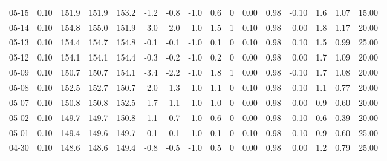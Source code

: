 \begin{threeparttable}
{\begin{tabular}{lrrrrrrrrrrrrrrr}
  05-15 &     0.10 & 151.9 & 151.9 & 153.2 &       -1.2 &           -0.8 &                     -1.0 &                 0.6 &              0 &       0.00 &      0.98 &          -0.10 &              1.6 &            1.07 &                  15.00 \\
  05-14 &     0.10 & 154.8 & 155.0 & 151.9 &        3.0 &            2.0 &                      1.0 &                 1.5 &              1 &       0.10 &      0.98 &           0.00 &              1.8 &            1.17 &                  20.00 \\
  05-13 &     0.10 & 154.4 & 154.7 & 154.8 &       -0.1 &           -0.1 &                     -1.0 &                 0.1 &              0 &       0.10 &      0.98 &           0.10 &              1.5 &            0.99 &                  25.00 \\
  05-12 &     0.10 & 154.1 & 154.1 & 154.4 &       -0.3 &           -0.2 &                     -1.0 &                 0.2 &              0 &       0.00 &      0.98 &           0.00 &              1.7 &            1.09 &                  20.00 \\
  05-09 &     0.10 & 150.7 & 150.7 & 154.1 &       -3.4 &           -2.2 &                     -1.0 &                 1.8 &              1 &       0.00 &      0.98 &          -0.10 &              1.7 &            1.08 &                  20.00 \\
  05-08 &     0.10 & 152.5 & 152.7 & 150.7 &        2.0 &            1.3 &                      1.0 &                 1.1 &              0 &       0.10 &      0.98 &           0.10 &              1.1 &            0.77 &                  20.00 \\
  05-07 &     0.10 & 150.8 & 150.8 & 152.5 &       -1.7 &           -1.1 &                     -1.0 &                 1.0 &              0 &       0.00 &      0.98 &           0.00 &              0.9 &            0.60 &                  20.00 \\
  05-02 &     0.10 & 149.7 & 149.7 & 150.8 &       -1.1 &           -0.7 &                     -1.0 &                 0.6 &              0 &       0.00 &      0.98 &          -0.10 &              0.6 &            0.39 &                  20.00 \\
  05-01 &     0.10 & 149.4 & 149.6 & 149.7 &       -0.1 &           -0.1 &                     -1.0 &                 0.1 &              0 &       0.10 &      0.98 &           0.10 &              0.9 &            0.60 &                  25.00 \\
  04-30 &     0.10 & 148.6 & 148.6 & 149.4 &       -0.8 &           -0.5 &                     -1.0 &                 0.5 &              0 &       0.00 &      0.98 &           0.00 &              1.2 &            0.79 &                  25.00 \\

\end{tabular}}
\end{threeparttable}
